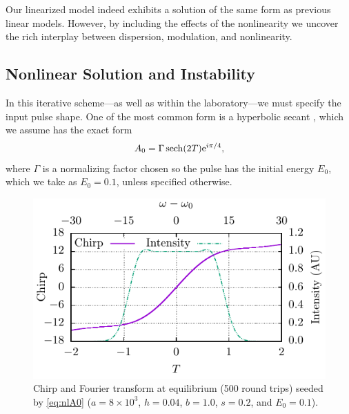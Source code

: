 \documentclass[9pt,twocolumn,twoside]{osajnl}
\let\originalleft\left
\let\originalright\right
\renewcommand{\left}{\mathopen{}\mathclose\bgroup\originalleft}
\renewcommand{\right}{\aftergroup\egroup\originalright}
\DeclareMathOperator{\sech}{sech}
\begin{document}
Our linearized model indeed exhibits a solution of the same form as previous linear models. However, by including the effects of the nonlinearity we uncover the rich interplay between dispersion, modulation, and nonlinearity.

\subsection{Nonlinear Solution and Instability}
\label{sec:nlresults}
In this iterative scheme---as well as within the laboratory---we must specify the input pulse shape. One of the most common form is a hyperbolic secant \cite{coen1997, finot2008, mitschke1986, rothenberg1989b, tomlinson1984}, which we assume has the exact form
\begin{align}
	A_0 = \Gamma \sech \left( 2 T \right) \textrm{e}^{i \pi / 4},
	\label{eq:nlA0}
\end{align}
where $\Gamma$ is a normalizing factor chosen so the pulse has the initial energy $E_0$, which we take as $E_0 = 0.1$, unless specified otherwise.

\begin{figure}[tbp]
	\centering
	\includegraphics{Figures/ChirpFT}
	\caption{Chirp and Fourier transform at equilibrium (500 round trips) seeded by \eqref{eq:nlA0} ($a = 8 \times 10^3$, $h = 0.04$, $b = 1.0$, $s = 0.2$, and $E_0 = 0.1$).}
	\label{fig:chirpft}
\end{figure}
\end{document}

